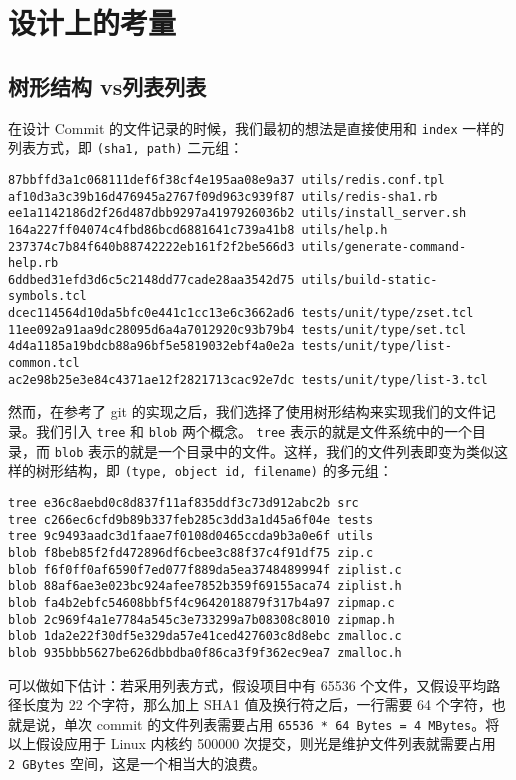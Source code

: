 \section{设计上的考量}

\subsection{树形结构 vs列表列表}

在设计 Commit 的文件记录的时候，我们最初的想法是直接使用和
\texttt{index} 一样的列表方式，即 \texttt{(sha1,\ path)} 二元组：

\begin{lstlisting}[language=Clean,numbers=none]
87bbffd3a1c068111def6f38cf4e195aa08e9a37 utils/redis.conf.tpl
af10d3a3c39b16d476945a2767f09d963c939f87 utils/redis-sha1.rb
ee1a1142186d2f26d487dbb9297a4197926036b2 utils/install_server.sh
164a227ff04074c4fbd86bcd6881641c739a41b8 utils/help.h
237374c7b84f640b88742222eb161f2f2be566d3 utils/generate-command-help.rb
6ddbed31efd3d6c5c2148dd77cade28aa3542d75 utils/build-static-symbols.tcl
dcec114564d10da5bfc0e441c1cc13e6c3662ad6 tests/unit/type/zset.tcl
11ee092a91aa9dc28095d6a4a7012920c93b79b4 tests/unit/type/set.tcl
4d4a1185a19bdcb88a96bf5e5819032ebf4a0e2a tests/unit/type/list-common.tcl
ac2e98b25e3e84c4371ae12f2821713cac92e7dc tests/unit/type/list-3.tcl
\end{lstlisting}

然而，在参考了 git
的实现之后，我们选择了使用树形结构来实现我们的文件记录。我们引入
\texttt{tree} 和 \texttt{blob} 两个概念。 \texttt{tree}
表示的就是文件系统中的一个目录，而 \texttt{blob}
表示的就是一个目录中的文件。这样，我们的文件列表即变为类似这样的树形结构，即
\texttt{(type,\ object\ id,\ filename)} 的多元组：

\begin{lstlisting}[language=Clean,numbers=none]
tree e36c8aebd0c8d837f11af835ddf3c73d912abc2b src
tree c266ec6cfd9b89b337feb285c3dd3a1d45a6f04e tests
tree 9c9493aadc3d1faae7f0108d0465ccda9b3a0e6f utils
blob f8beb85f2fd472896df6cbee3c88f37c4f91df75 zip.c
blob f6f0ff0af6590f7ed077f889da5ea3748489994f ziplist.c
blob 88af6ae3e023bc924afee7852b359f69155aca74 ziplist.h
blob fa4b2ebfc54608bbf5f4c9642018879f317b4a97 zipmap.c
blob 2c969f4a1e7784a545c3e733299a7b08308c8010 zipmap.h
blob 1da2e22f30df5e329da57e41ced427603c8d8ebc zmalloc.c
blob 935bbb5627be626dbbdba0f86ca3f9f362ec9ea7 zmalloc.h
\end{lstlisting}

可以做如下估计：若采用列表方式，假设项目中有 65536
个文件，又假设平均路径长度为 22 个字符，那么加上 SHA1
值及换行符之后，一行需要 64 个字符，也就是说，单次 commit
的文件列表需要占用
\texttt{65536~*~64~Bytes~=~4~MBytes}。将以上假设应用于 Linux
内核约 500000 次提交，则光是维护文件列表就需要占用 \texttt{2~GBytes}
空间，这是一个相当大的浪费。

